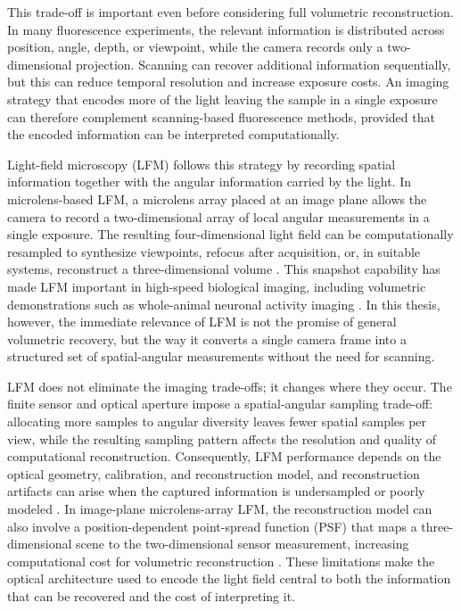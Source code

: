 This trade-off is important even before considering full volumetric reconstruction. In many fluorescence experiments, the relevant information is distributed across position, angle, depth, or viewpoint, while the camera records only a two-dimensional projection. Scanning can recover additional information sequentially, but this can reduce temporal resolution and increase exposure costs. An imaging strategy that encodes more of the light leaving the sample in a single exposure can therefore complement scanning-based fluorescence methods, provided that the encoded information can be interpreted computationally.

Light-field microscopy (LFM) follows this strategy by recording spatial information together with the angular information carried by the light. In microlens-based LFM, a microlens array placed at an image plane allows the camera to record a two-dimensional array of local angular measurements in a single exposure. The resulting four-dimensional light field can be computationally resampled to synthesize viewpoints, refocus after acquisition, or, in suitable systems, reconstruct a three-dimensional volume \cite{levoy2006lightFieldMicroscopy,levoy2009recordingControlling4d,broxton2013waveOpticsLfm}. This snapshot capability has made LFM important in high-speed biological imaging, including volumetric demonstrations such as whole-animal neuronal activity imaging \cite{prevedel2014wholeAnimalLfm}. In this thesis, however, the immediate relevance of LFM is not the promise of general volumetric recovery, but the way it converts a single camera frame into a structured set of spatial-angular measurements without the need for scanning.

LFM does not eliminate the imaging trade-offs; it changes where they occur. The finite sensor and optical aperture impose a spatial-angular sampling trade-off: allocating more samples to angular diversity leaves fewer spatial samples per view, while the resulting sampling pattern affects the resolution and quality of computational reconstruction. Consequently, LFM performance depends on the optical geometry, calibration, and reconstruction model, and reconstruction artifacts can arise when the captured information is undersampled or poorly modeled \cite{levoy2009recordingControlling4d,broxton2013waveOpticsLfm,stefanoiu2019artifactFreeDeconvolution}. In image-plane microlens-array LFM, the reconstruction model can also involve a position-dependent point-spread function (PSF) that maps a three-dimensional scene to the two-dimensional sensor measurement, increasing computational cost for volumetric reconstruction \cite{broxton2013waveOpticsLfm,guo2019fourierLightField}. These limitations make the optical architecture used to encode the light field central to both the information that can be recovered and the cost of interpreting it.

